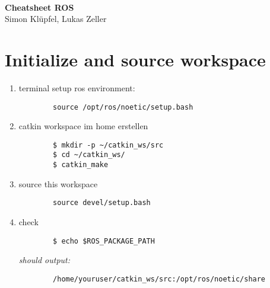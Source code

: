 \documentclass[11pt]{article}
\begin{document}
\begin{center}
 \\ \textbf{\Large \color{blue} Cheatsheet ROS} \\ Simon Klüpfel, Lukas Zeller
\end{center}
\section*{Initialize and source workspace}
\begin{enumerate}
    \item terminal setup ros environment:
    \begin{verbatim}
        source /opt/ros/noetic/setup.bash
    \end{verbatim}
    \item catkin workspace im home erstellen
    \begin{verbatim}
        $ mkdir -p ~/catkin_ws/src
        $ cd ~/catkin_ws/
        $ catkin_make
    \end{verbatim}
    \item source this workspace
    \begin{verbatim}
        source devel/setup.bash
    \end{verbatim}
    \item check
    \begin{verbatim}
        $ echo $ROS_PACKAGE_PATH 
    \end{verbatim}
    \textit{should output:}
    \begin{verbatim}
        /home/youruser/catkin_ws/src:/opt/ros/noetic/share
    \end{verbatim}
\end{enumerate}
\end{document}
